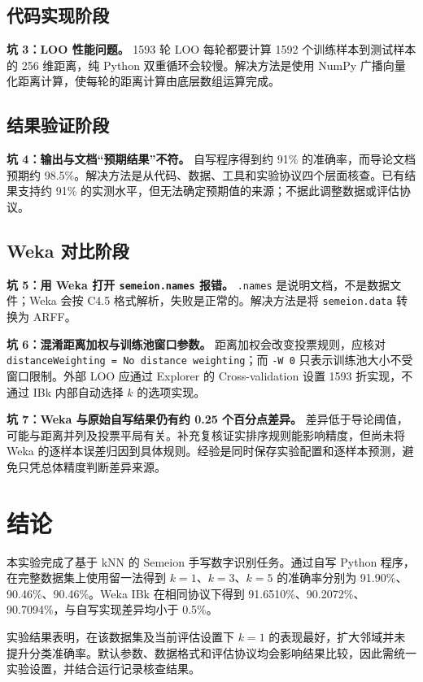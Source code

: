 \documentclass[UTF8,zihao=-4]{ctexart}
\begin{document}
\subsection{代码实现阶段}

\textbf{坑 3：LOO 性能问题。} 1593 轮 LOO 每轮都要计算 1592 个训练样本到测试样本的 256 维距离，纯 Python 双重循环会较慢。解决方法是使用 NumPy 广播向量化距离计算，使每轮的距离计算由底层数组运算完成。

\subsection{结果验证阶段}

\textbf{坑 4：输出与文档“预期结果”不符。} 自写程序得到约 91\% 的准确率，而导论文档预期约 98.5\%。解决方法是从代码、数据、工具和实验协议四个层面核查。已有结果支持约 91\% 的实测水平，但无法确定预期值的来源；不据此调整数据或评估协议。

\subsection{Weka 对比阶段}

\textbf{坑 5：用 Weka 打开 \texttt{semeion.names} 报错。} \texttt{.names} 是说明文档，不是数据文件；Weka 会按 C4.5 格式解析，失败是正常的。解决方法是将 \texttt{semeion.data} 转换为 ARFF。

\textbf{坑 6：混淆距离加权与训练池窗口参数。} 距离加权会改变投票规则，应核对 \texttt{distanceWeighting = No distance weighting}；而 \texttt{-W 0} 只表示训练池大小不受窗口限制。外部 LOO 应通过 Explorer 的 Cross-validation 设置 1593 折实现，不通过 IBk 内部自动选择 $k$ 的选项实现。

\textbf{坑 7：Weka 与原始自写结果仍有约 0.25 个百分点差异。} 差异低于导论阈值，可能与距离并列及投票平局有关。补充复核证实排序规则能影响精度，但尚未将 Weka 的逐样本误差归因到具体规则。经验是同时保存实验配置和逐样本预测，避免只凭总体精度判断差异来源。

\section{结论}

本实验完成了基于 kNN 的 Semeion 手写数字识别任务。通过自写 Python 程序，在完整数据集上使用留一法得到 $k=1$、$k=3$、$k=5$ 的准确率分别为 91.90\%、90.46\%、90.46\%。Weka IBk 在相同协议下得到 91.6510\%、90.2072\%、90.7094\%，与自写实现差异均小于 0.5\%。

实验结果表明，在该数据集及当前评估设置下 $k=1$ 的表现最好，扩大邻域并未提升分类准确率。默认参数、数据格式和评估协议均会影响结果比较，因此需统一实验设置，并结合运行记录核查结果。
\end{document}
